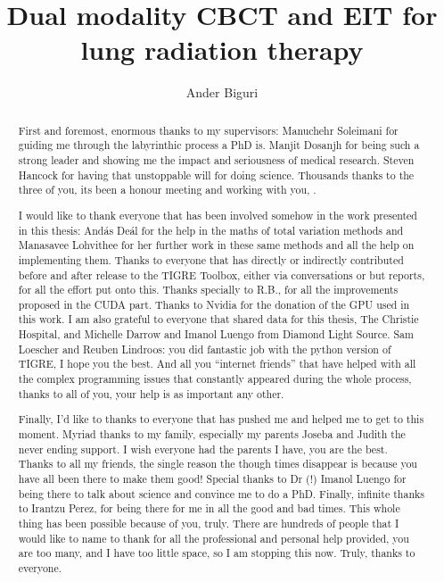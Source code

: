 \documentclass[11pt]{report}
\title{Dual modality CBCT and EIT for lung radiation therapy}
\author{Ander Biguri}
\begin{document}
\maketitle





\tableofcontents
\listoffigures
\listoftables


\renewcommand{\abstractname}{Acknowledgements}
\begin{abstract}
First and foremost, enormous thanks to my supervisors:  Manuchehr Soleimani for guiding me through the labyrinthic process a PhD is. Manjit Dosanjh for being such a strong leader and showing me the impact and seriousness of medical research. Steven Hancock for having that unstoppable will for doing science. Thousands thanks to the three of you, its been a honour meeting and working with you, .

I would like to thank everyone that has been involved somehow in the work presented in this thesis: And\'as De\'al for the help in the maths of total variation methods and Manasavee Lohvithee for her further work in these same methods and all the help on implementing them. Thanks to everyone that has directly or indirectly contributed before and after release to the TIGRE Toolbox, either via conversations or but reports, for all the effort put onto this. Thanks specially to R.B., for all the improvements proposed in the CUDA part. Thanks to Nvidia for the donation of the GPU used in this work. I am also grateful to everyone that shared data for this thesis, The Christie Hospital, and Michelle Darrow and Imanol Luengo from Diamond Light Source. Sam Loescher and Reuben Lindroos: you did fantastic job with the python version of TIGRE, I hope you the best. And all you ``internet friends'' that have helped with all the complex programming issues that constantly appeared during the whole process, thanks to all of you, your help is as important any other.

Finally, I'd like to thanks to everyone that has pushed me and helped me to get to this moment. Myriad thanks to my family, especially my parents Joseba and Judith the never ending support. I wish everyone had the parents I have, you are the best. Thanks to all my friends, the single reason the though times disappear is because you have all been there to make them good! Special thanks to Dr (!) Imanol Luengo for being there to talk about science and convince me to do a PhD. Finally, infinite thanks to Irantzu Perez, for being there for me in all the good and bad times. This whole thing has been possible because of you, truly. There are hundreds of people that I would like to name to thank for all the professional and personal help provided, you are too many, and I have too little space, so I am stopping this now. Truly, thanks to everyone.


\end{abstract}
\end{document}
